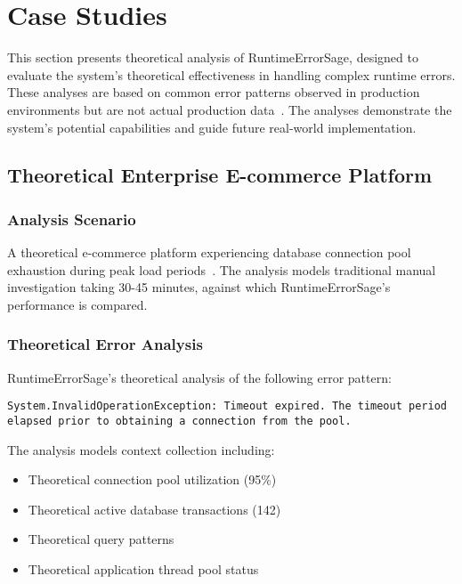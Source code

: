 \section{Case Studies}\label{sec:case-studies}

This section presents theoretical analysis of RuntimeErrorSage, designed to evaluate the system's theoretical effectiveness in handling complex runtime errors. These analyses are based on common error patterns observed in production environments but are not actual production data~\cite{production_error_analysis_2023, runtime_remediation_2024}. The analyses demonstrate the system's potential capabilities and guide future real-world implementation.

\subsection{Theoretical Enterprise E-commerce Platform}

\subsubsection{Analysis Scenario}
A theoretical e-commerce platform experiencing database connection pool exhaustion during peak load periods~\cite{database_performance_2023}. The analysis models traditional manual investigation taking 30-45 minutes, against which RuntimeErrorSage's performance is compared.

\subsubsection{Theoretical Error Analysis}
RuntimeErrorSage's theoretical analysis of the following error pattern:
\begin{lstlisting}[style=csharpstyle,caption={Theoretical Database Connection Pool Error}]
System.InvalidOperationException: Timeout expired. The timeout period elapsed prior to obtaining a connection from the pool.
\end{lstlisting}

The analysis models context collection including:
\begin{itemize}
    \item Theoretical connection pool utilization (95\%)
    \item Theoretical active database transactions (142)
    \item Theoretical query patterns
    \item Theoretical application thread pool status
\end{itemize}

